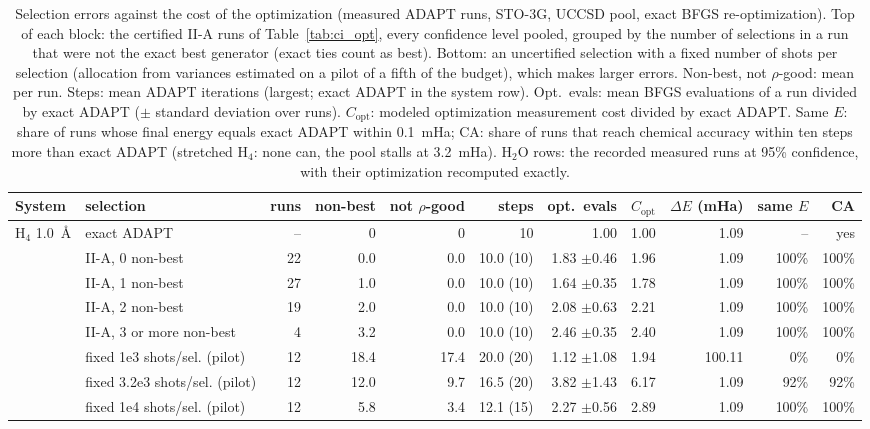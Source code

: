 \begin{table}[!htb]
\centering\small
\caption{Selection errors against the cost of the optimization (measured ADAPT runs, STO-3G, UCCSD pool, exact BFGS re-optimization). Top of each block: the certified II-A runs of Table~\ref{tab:ci_opt}, every confidence level pooled, grouped by the number of selections in a run that were not the exact best generator (exact ties count as best). Bottom: an uncertified selection with a fixed number of shots per selection (allocation from variances estimated on a pilot of a fifth of the budget), which makes larger errors. Non-best, not $\rho$-good: mean per run. Steps: mean ADAPT iterations (largest; exact ADAPT in the system row). Opt.\ evals: mean BFGS evaluations of a run divided by exact ADAPT ($\pm$ standard deviation over runs). $C_\mathrm{opt}$: modeled optimization measurement cost divided by exact ADAPT. Same $E$: share of runs whose final energy equals exact ADAPT within 0.1~mHa; CA: share of runs that reach chemical accuracy within ten steps more than exact ADAPT (stretched H$_4$: none can, the pool stalls at 3.2~mHa). H$_2$O rows: the recorded measured runs at 95\% confidence, with their optimization recomputed exactly.}
\label{tab:err_opt}
\footnotesize\setlength{\tabcolsep}{3pt}
\begin{tabular}{llrrrrrrrrr}
\toprule
System & selection & runs & non-best & not $\rho$-good & steps & opt.\ evals & $C_\mathrm{opt}$ & $\Delta E$ (mHa) & same $E$ & CA \\
\midrule
H$_4$ 1.0~\AA & exact ADAPT & -- & 0 & 0 & 10 & 1.00 & 1.00 & 1.09 & -- & yes \\
 & II-A, 0 non-best & 22 & 0.0 & 0.0 & 10.0 (10) & 1.83 $\pm$0.46 & 1.96 & 1.09 & 100\% & 100\% \\
 & II-A, 1 non-best & 27 & 1.0 & 0.0 & 10.0 (10) & 1.64 $\pm$0.35 & 1.78 & 1.09 & 100\% & 100\% \\
 & II-A, 2 non-best & 19 & 2.0 & 0.0 & 10.0 (10) & 2.08 $\pm$0.63 & 2.21 & 1.09 & 100\% & 100\% \\
 & II-A, 3 or more non-best & 4 & 3.2 & 0.0 & 10.0 (10) & 2.46 $\pm$0.35 & 2.40 & 1.09 & 100\% & 100\% \\
 & fixed 1e3 shots/sel. (pilot) & 12 & 18.4 & 17.4 & 20.0 (20) & 1.12 $\pm$1.08 & 1.94 & 100.11 & 0\% & 0\% \\
 & fixed 3.2e3 shots/sel. (pilot) & 12 & 12.0 & 9.7 & 16.5 (20) & 3.82 $\pm$1.43 & 6.17 & 1.09 & 92\% & 92\% \\
 & fixed 1e4 shots/sel. (pilot) & 12 & 5.8 & 3.4 & 12.1 (15) & 2.27 $\pm$0.56 & 2.89 & 1.09 & 100\% & 100\% \\

\end{tabular}
\end{table}
